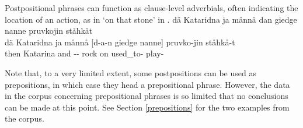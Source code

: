 Postpositional phrases %
can function as clause-level adverbials, often indicating the location of an action, as in  ‘on that stone’ in . 
\ea\label{ADVppEx1}%
\glll	dä Kataridna ja månnå dan giedge nanne pruvkojin ståhkåt\\
	dä Kataridna ja månnå {[d-a-n} giedge {nanne]\subPP} pruvko-jin ståhkå-t\\
	then Katarina\BS{} and  -- rock\BS{} on used\_to- play-\\\nopagebreak
{}	
\z


Note that, to a very limited extent, some postpositions can be used as prepositions, in which case they head a prepositional phrase. However, the data in the corpus concerning prepositional phrases is so limited that no conclusions can be made at this point. See Section \ref{prepositions} for the two examples from the corpus. 





%